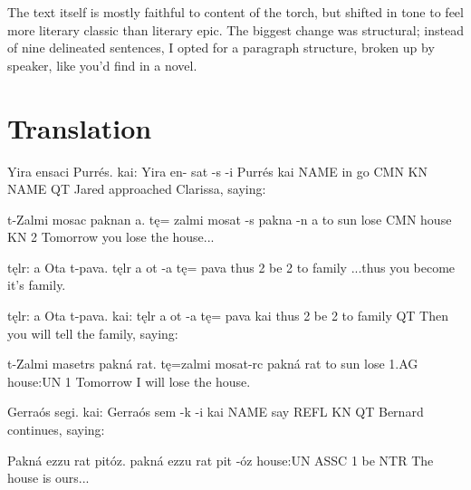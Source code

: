 \documentclass[fontsize=12pt,twoside=false,numbers=noenddot]{class/kaobook}
\newcommand{\tbf}[1]{\textbf{#1}}
\newenvironment{example*}{
	\begin{minipage}{164.6mm}%
	\examples%
	\ex%
}{%
	\endexamples%
	\end{minipage}%
}%
\begin{document}
The text itself is mostly faithful to content of the torch, but shifted in tone to feel more literary classic than literary epic.  The biggest change was structural; instead of nine delineated sentences, I opted for a paragraph structure, broken up by speaker, like you'd find in a novel. %

\chapter{Translation}
\begin{example*}
\script Yira ensaci Purrés. kai:
\bits Yira en- sat -s -i Purrés kai
\gloss NAME in go CMN KN NAME QT
\tr Jared approached Clarissa, saying:
\end{example*}

\begin{example*}
\script t-Zalmi mosac paknan a.
\bits tę= zalmi mosat -s pakna -n a
\gloss to sun lose CMN house KN 2
\tr Tomorrow you lose the house...
\end{example*}

\begin{example*}
\script tęlr: a Ota t-pava.
\bits tęlr a ot -a tę= pava
\gloss thus 2 be 2 to family
\tr ...thus you become it's family.
\end{example*}

\begin{example*}
\script tęlr: a Ota t-pava. kai:
\bits tęlr a ot -a tę= pava kai
\gloss thus 2 be 2 to family QT
\tr Then you will tell the family, saying:
\end{example*}

\begin{example*}
\script t-Zalmi masetrs pakná rat.
\bits tę=zalmi mosat-rc   pakná    rat
\gloss to sun lose 1.AG house:UN 1
\tr Tomorrow I will lose the house.
\end{example*}

\begin{example*}
\script Gerraós segi. kai:
\bits Gerraós sem -k -i kai
\gloss NAME say REFL KN QT
\tr Bernard continues, saying:
\end{example*}

\begin{example*}
\script Pakná ezzu rat pitóz.
\bits pakná ezzu rat pit -óz
\gloss house:UN ASSC 1 be NTR
\tr The house is ours...
\end{example*}
\end{document}

